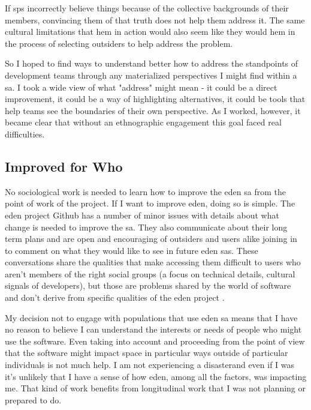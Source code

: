 \documentclass[a4paper,man,natbib,floatsintext]{apa6}
\begin{document}
  If \glspl{sp} incorrectly believe things because of the collective backgrounds of their members, convincing them of that truth does not help them address it. The same cultural limitations that hem in action would also seem like they would hem in the process of selecting outsiders to help address the problem.

  So I hoped to find ways to understand better how to address the standpoints of development teams through any materialized perspectives I might find within a \gls{sa}. I took a wide view of what "address" might mean - it could be a direct improvement, it could be a way of highlighting alternatives, it could be tools that help teams see the boundaries of their own perspective. As I worked, however, it became clear that without an ethnographic engagement this goal faced real difficulties.

  \subsection{Improved for Who}
  No sociological work is needed to learn how to improve the \acrshort{eden} \gls{sa} from the point of work of the project. If I want to improve \acrshort{eden}, doing so is simple. The \acrshort{eden} project Github has a number of minor issues with details about what change is needed to improve the \gls{sa}. They also communicate about their long term plans and are open and encouraging of outsiders and users alike joining in to comment on what they would like to see in future \acrshort{eden} \glspl{sa}. These conversations share the qualities that make accessing them difficult to users who aren't members of the right social groups (a focus on technical details, cultural signals of developers), but those are problems shared by the world of software and don't derive from specific qualities of the \acrshort{eden} project \citep{Drexler2019-tk,Kelty2008-jm}.

  My decision not to engage with populations that use \acrshort{eden} \gls{sa} means that I have no reason to believe I can understand the interests or needs of people who might use the software. Even taking \citet{Kitchin2011-af} into account and proceeding from the point of view that the software might impact space in particular ways outside of particular individuals is not much help. I am not experiencing a disaster\footnotemark and even if I was it's unlikely that I have a sense of how \acrshort{eden}, among all the factors, was impacting me. That kind of work benefits from longitudinal work that I was not planning or prepared to do.
\end{document}
